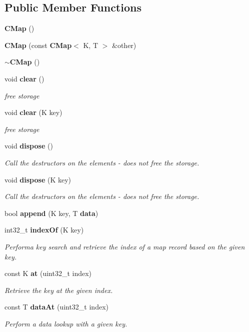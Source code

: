\subsection*{Public Member Functions}
\begin{DoxyCompactItemize}
\item 
{\bf C\+Map} ()
\item 
{\bf C\+Map} (const {\bf C\+Map}$<$ K, T $>$ \&other)
\item 
{\bf $\sim$\+C\+Map} ()
\item 
void {\bf clear} ()
\begin{DoxyCompactList}\small\item\em free storage \end{DoxyCompactList}\item 
void {\bf clear} (K key)
\begin{DoxyCompactList}\small\item\em free storage \end{DoxyCompactList}\item 
void {\bf dispose} ()
\begin{DoxyCompactList}\small\item\em Call the destructors on the elements -\/ does not free the storage. \end{DoxyCompactList}\item 
void {\bf dispose} (K key)
\begin{DoxyCompactList}\small\item\em Call the destructors on the elements -\/ does not free the storage. \end{DoxyCompactList}\item 
bool {\bf append} (K key, T {\bf data})
\item 
int32\+\_\+t {\bf index\+Of} (K key)
\begin{DoxyCompactList}\small\item\em Performa key search and retrieve the index of a map record based on the given key. \end{DoxyCompactList}\item 
const K {\bf at} (uint32\+\_\+t index)
\begin{DoxyCompactList}\small\item\em Retrieve the key at the given index. \end{DoxyCompactList}\item 
const T {\bf data\+At} (uint32\+\_\+t index)
\begin{DoxyCompactList}\small\item\em Perform a data lookup with a given key. \end{DoxyCompactList}\item 

\end{DoxyCompactItemize}
